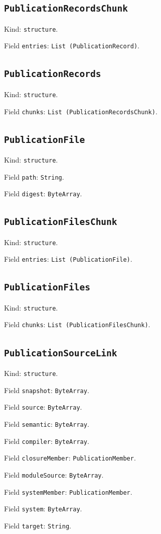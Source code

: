 \documentclass[11pt]{article}
\begin{document}
\subsection*{\texttt{PublicationRecordsChunk}}
\noindent Kind: \texttt{structure}.\par
\noindent Field \texttt{entries}: \texttt{List (PublicationRecord)}.\par
\subsection*{\texttt{PublicationRecords}}
\noindent Kind: \texttt{structure}.\par
\noindent Field \texttt{chunks}: \texttt{List (PublicationRecordsChunk)}.\par
\subsection*{\texttt{PublicationFile}}
\noindent Kind: \texttt{structure}.\par
\noindent Field \texttt{path}: \texttt{String}.\par
\noindent Field \texttt{digest}: \texttt{ByteArray}.\par
\subsection*{\texttt{PublicationFilesChunk}}
\noindent Kind: \texttt{structure}.\par
\noindent Field \texttt{entries}: \texttt{List (PublicationFile)}.\par
\subsection*{\texttt{PublicationFiles}}
\noindent Kind: \texttt{structure}.\par
\noindent Field \texttt{chunks}: \texttt{List (PublicationFilesChunk)}.\par
\subsection*{\texttt{PublicationSourceLink}}
\noindent Kind: \texttt{structure}.\par
\noindent Field \texttt{snapshot}: \texttt{ByteArray}.\par
\noindent Field \texttt{source}: \texttt{ByteArray}.\par
\noindent Field \texttt{semantic}: \texttt{ByteArray}.\par
\noindent Field \texttt{compiler}: \texttt{ByteArray}.\par
\noindent Field \texttt{closureMember}: \texttt{PublicationMember}.\par
\noindent Field \texttt{moduleSource}: \texttt{ByteArray}.\par
\noindent Field \texttt{systemMember}: \texttt{PublicationMember}.\par
\noindent Field \texttt{system}: \texttt{ByteArray}.\par
\noindent Field \texttt{target}: \texttt{String}.\par
\end{document}
